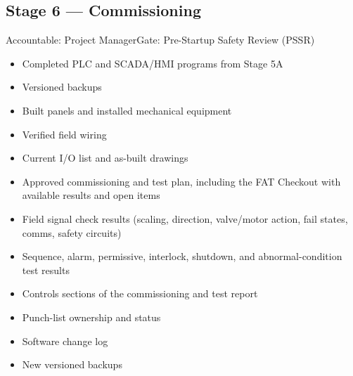 \subsection{Stage 6 --- Commissioning}
\begin{stagecard}{Accountable: Project Manager}{Gate: Pre-Startup Safety Review (PSSR)}
\tcbline
\begin{minipage}[t]{0.485\linewidth}
\begin{itemize}[leftmargin=*,itemsep=1pt,topsep=2pt]
  \item Completed PLC and SCADA/HMI programs from Stage 5A
  \item Versioned backups
  \item Built panels and installed mechanical equipment
  \item Verified field wiring
  \item Current I/O list and as-built drawings
  \item Approved commissioning and test plan, including the FAT Checkout with available results and open items
\end{itemize}
\end{minipage}\hfill
\begin{minipage}[t]{0.485\linewidth}
\begin{itemize}[leftmargin=*,itemsep=1pt,topsep=2pt]
  \item Field signal check results (scaling, direction, valve/motor action, fail states, comms, safety circuits)
  \item Sequence, alarm, permissive, interlock, shutdown, and abnormal-condition test results
  \item Controls sections of the commissioning and test report
  \item Punch-list ownership and status
  \item Software change log
  \item New versioned backups
\end{itemize}
\end{minipage}
\tcbline
{}
\begin{itemize}[leftmargin=*,itemsep=1pt,topsep=2pt]

\end{itemize}
\end{stagecard}
